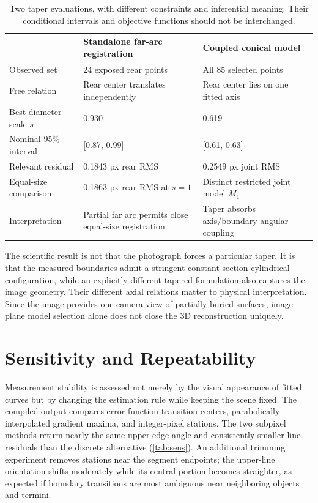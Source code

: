 \documentclass[11pt,letterpaper]{article}
\begin{document}
\begin{table}[ht]
\centering\small
\caption{Two taper evaluations, with different constraints and inferential meaning. Their conditional intervals and objective functions should not be interchanged.}
\label{tab:taper}
\begin{tabularx}{\linewidth}{@{}l X X@{}}
\toprule
 & \textbf{Standalone far-arc registration} & \textbf{Coupled conical model} \\
\midrule
Observed set & 24 exposed rear points & All 85 selected points \\
Free relation & Rear center translates independently & Rear center lies on one fitted axis \\
Best diameter scale \(s\) & 0.930 & 0.619 \\
Nominal 95\% interval & [0.87, 0.99] & [0.61, 0.63] \\
Relevant residual & 0.1843 px rear RMS & 0.2549 px joint RMS \\
Equal-size comparison & 0.1863 px rear RMS at \(s=1\) & Distinct restricted joint model \(M_1\) \\
Interpretation & Partial far arc permits close equal-size registration & Taper absorbs axis/boundary angular coupling \\
\bottomrule
\end{tabularx}
\end{table}

The scientific result is not that the photograph forces a particular taper. It is that the measured boundaries admit a stringent constant-section cylindrical configuration, while an explicitly different tapered formulation also captures the image geometry. Their different axial relations matter to physical interpretation. Since the image provides one camera view of partially buried surfaces, image-plane model selection alone does not close the 3D reconstruction uniquely.

\section{Sensitivity and Repeatability}
\label{sec:sensitivity}

Measurement stability is assessed not merely by the visual appearance of fitted curves but by changing the estimation rule while keeping the scene fixed. The compiled output compares error-function transition centers, parabolically interpolated gradient maxima, and integer-pixel stations. The two subpixel methods return nearly the same upper-edge angle and consistently smaller line residuals than the discrete alternative (\cref{tab:sens}). An additional trimming experiment removes stations near the segment endpoints; the upper-line orientation shifts moderately while its central portion becomes straighter, as expected if boundary transitions are most ambiguous near neighboring objects and termini.
\end{document}
